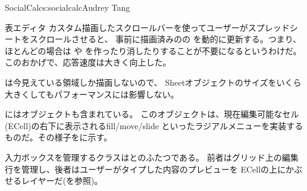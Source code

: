 \begin{aosachapter}{SocialCalc}{s:socialcalc}{Audrey Tang}
\begin{aosasect1}{表エディタ}
カスタム描画したスクロールバーを使ってユーザーがスプレッドシートをスクロールさせると、
事前に描画済みのの
を動的に更新する。つまり、ほとんどの場合は
や
を作ったり消したりすることが不要になるというわけだ。
このおかげで、応答速度は大きく向上した。

は今見えている領域しか描画しないので、
Sheetオブジェクトのサイズをいくら大きくしてもパフォーマンスには影響しない。

にはオブジェクトも含まれている。
このオブジェクトは、現在編集可能なセル(ECell)の右下に表示されるfill/move/slide
といったラジアルメニューを実装するものだ。その様子をに示す。


入力ボックスを管理するクラスはとのふたつである。
前者はグリッド上の編集行を管理し、後者はユーザーがタイプした内容のプレビューを
ECellの上にかぶせるレイヤーだ(を参照)。



\end{aosasect1}
\end{aosachapter}
